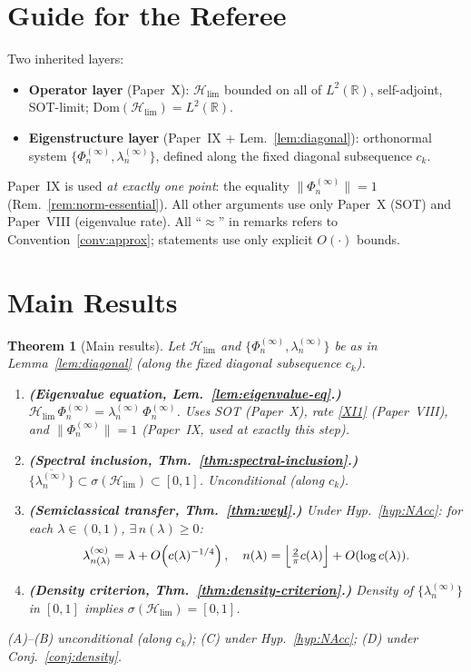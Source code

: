\documentclass[12pt,a4paper]{amsart}
\newtheorem{theorem}{Theorem}[section]
\theoremstyle{definition}
\theoremstyle{remark}
\newcommand{\Hlim}{\mathcal{H}_{\lim}}
\newcommand{\Dom}{\mathrm{Dom}}
\begin{document}
\section*{Guide for the Referee}
Two inherited layers:
\begin{itemize}
\item \textbf{Operator layer} (Paper~X):
      $\Hlim$ bounded on all of $L^2(\mathbb{R})$,
      self-adjoint, SOT-limit;
      $\Dom(\Hlim)=L^2(\mathbb{R})$.
\item \textbf{Eigenstructure layer}
      (Paper~IX + Lem.~\ref{lem:diagonal}):
      orthonormal system
      $\{\Phi_n^{(\infty)},\lambda_n^{(\infty)}\}$,
      defined along the fixed diagonal
      subsequence $c_k$.
\end{itemize}
Paper~IX is used \emph{at exactly one point}:
the equality $\|\Phi_n^{(\infty)}\|=1$
(Rem.~\ref{rem:norm-essential}).
All other arguments use only Paper~X (SOT) and
Paper~VIII (eigenvalue rate).
All ``$\approx$'' in remarks refers to
Convention~\ref{conv:approx};
statements use only explicit $O(\cdot)$ bounds.

\tableofcontents

\section{Main Results}
\label{sec:main}

\begin{theorem}[Main results]
\label{thm:main}
Let $\Hlim$ and
$\{\Phi_n^{(\infty)},\lambda_n^{(\infty)}\}$
be as in Lemma~\ref{lem:diagonal}
(along the fixed diagonal subsequence $c_k$).
\begin{enumerate}[\rm(A)]
\item \textbf{(Eigenvalue equation,
      Lem.~\ref{lem:eigenvalue-eq}.)}
      $\Hlim\,\Phi_n^{(\infty)}
      =\lambda_n^{(\infty)}\,\Phi_n^{(\infty)}$.
      Uses SOT (Paper~X), rate \eqref{XI1}
      (Paper~VIII), and $\|\Phi_n^{(\infty)}\|=1$
      (Paper~IX, used at exactly this step).
\item \textbf{(Spectral inclusion,
      Thm.~\ref{thm:spectral-inclusion}.)}
      $\overline{\{\lambda_n^{(\infty)}\}}
      \subset\sigma(\Hlim)\subset[0,1]$.
      Unconditional (along $c_k$).
\item \textbf{(Semiclassical transfer,
      Thm.~\ref{thm:weyl}.)}
      Under Hyp.~\ref{hyp:NAcc}:
      for each $\lambda\in(0,1)$,
      $\exists\, n(\lambda)\ge 0$:
      \[
        \lambda_{n(\lambda)}^{(\infty)}
        = \lambda + O\!\left(c(\lambda)^{-1/4}\right),
        \quad
        n(\lambda)
        = \Bigl\lfloor\tfrac{2}{\pi}c(\lambda)\Bigr\rfloor
          + O(\log c(\lambda)).
      \]
\item \textbf{(Density criterion,
      Thm.~\ref{thm:density-criterion}.)}
      Density of $\{\lambda_n^{(\infty)}\}$ in $[0,1]$
      implies $\sigma(\Hlim)=[0,1]$.
\end{enumerate}
(A)--(B) unconditional (along $c_k$);
(C) under Hyp.~\ref{hyp:NAcc};
(D) under Conj.~\ref{conj:density}.
\end{theorem}
\end{document}
